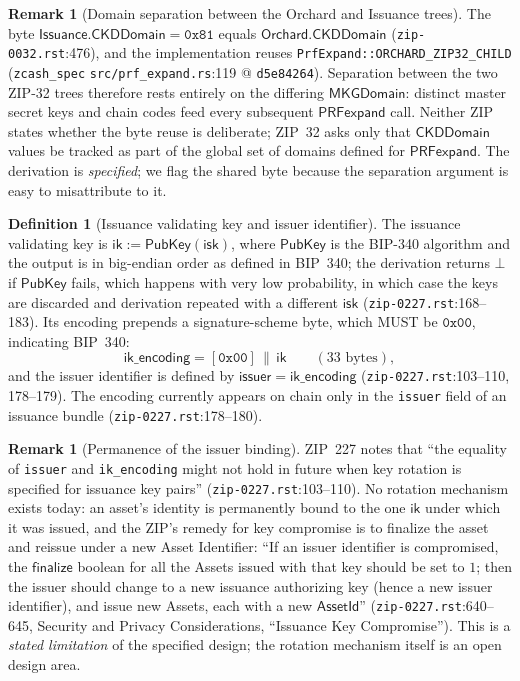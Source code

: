 \documentclass[11pt,a4paper]{article}
\theoremstyle{definition}
\newtheorem{definition}[theorem]{Definition}
\newtheorem{remark}[theorem]{Remark}
\begin{document}
\begin{remark}[Domain separation between the Orchard and Issuance trees]
\label{rem:zsa-ckd-domain}
The byte $\mathsf{Issuance.CKDDomain} = \mathtt{0x81}$ equals
$\mathsf{Orchard.CKDDomain}$ (\texttt{zip-0032.rst}:476), and the
implementation reuses \texttt{PrfExpand::ORCHARD\_ZIP32\_CHILD}
(\texttt{zcash\_spec} \texttt{src/prf\_expand.rs}:119 @
\texttt{d5e84264}). Separation between the two ZIP-32 trees therefore
rests entirely on the differing $\mathsf{MKGDomain}$: distinct master
secret keys and chain codes feed every subsequent
$\mathsf{PRFexpand}$ call. Neither ZIP states whether the byte reuse is
deliberate; ZIP~32 asks only that $\mathsf{CKDDomain}$ values be tracked as
part of the global set of domains defined for $\mathsf{PRFexpand}$. The
derivation is \emph{specified}; we flag the shared byte because the
separation argument is easy to misattribute to it.
\end{remark}

\begin{definition}[Issuance validating key and issuer identifier]
\label{def:zsa-ik}
The issuance validating key is
$\mathsf{ik} := \mathsf{PubKey}(\mathsf{isk})$, where $\mathsf{PubKey}$ is
the BIP-340 algorithm and the output is in big-endian order as defined in
BIP~340; the derivation returns $\bot$ if $\mathsf{PubKey}$ fails, which
happens with very low probability, in which case the keys are discarded
and derivation repeated with a different $\mathsf{isk}$
(\texttt{zip-0227.rst}:168--183). Its encoding prepends a signature-scheme
byte, which MUST be $\mathtt{0x00}$, indicating BIP~340:
\[
\mathsf{ik\_encoding} = [\mathtt{0x00}] \,\|\, \mathsf{ik}
\qquad (33 \text{ bytes}),
\]
and the issuer identifier is defined by
$\mathsf{issuer} = \mathsf{ik\_encoding}$
(\texttt{zip-0227.rst}:103--110, 178--179). The encoding currently appears
on chain only in the \texttt{issuer} field of an issuance bundle
(\texttt{zip-0227.rst}:178--180).
\end{definition}

\begin{remark}[Permanence of the issuer binding]\label{rem:zsa-rotation}
ZIP~227 notes that ``the equality of \texttt{issuer} and
\texttt{ik\_encoding} might not hold in future when key rotation is
specified for issuance key pairs'' (\texttt{zip-0227.rst}:103--110). No
rotation mechanism exists today: an asset's identity is permanently bound
to the one $\mathsf{ik}$ under which it was issued, and the ZIP's remedy
for key compromise is to finalize the asset and reissue under a new Asset
Identifier: ``If an issuer identifier is compromised, the
$\mathsf{finalize}$ boolean for all the Assets issued with that key should
be set to $1$; then the issuer should change to a new issuance authorizing
key (hence a new issuer identifier), and issue new Assets, each with a new
$\mathsf{AssetId}$'' (\texttt{zip-0227.rst}:640--645, Security and Privacy
Considerations, ``Issuance Key Compromise'').
This is a \emph{stated limitation} of the specified design; the rotation
mechanism itself is an open design area.
\end{remark}
\end{document}

